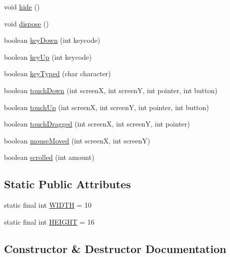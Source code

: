 \begin{DoxyCompactItemize}
void \hyperlink{classbattle_1_1gui_1_1_place_screen_a9a15290163612a59ceb587f623d3981e}{hide} ()
\item 
void \hyperlink{classbattle_1_1gui_1_1_place_screen_a92c96397bd5e073215261dbb39667745}{dispose} ()
\item 
boolean \hyperlink{classbattle_1_1gui_1_1_place_screen_afd827f84464f043634c9486106ab887e}{key\+Down} (int keycode)
\item 
boolean \hyperlink{classbattle_1_1gui_1_1_place_screen_a1f73c5aa408e52db7299eebc3c850b20}{key\+Up} (int keycode)
\item 
boolean \hyperlink{classbattle_1_1gui_1_1_place_screen_a000faa69a9c9dc4bc933539bed194558}{key\+Typed} (char character)
\item 
boolean \hyperlink{classbattle_1_1gui_1_1_place_screen_add2fe6657785a574fbc91787085eb70c}{touch\+Down} (int screen\+X, int screen\+Y, int pointer, int button)
\item 
boolean \hyperlink{classbattle_1_1gui_1_1_place_screen_a91bb3725374aa647ebb36641b5290aeb}{touch\+Up} (int screen\+X, int screen\+Y, int pointer, int button)
\item 
boolean \hyperlink{classbattle_1_1gui_1_1_place_screen_abc5c506818f56f4d300bc5a1f2a94841}{touch\+Dragged} (int screen\+X, int screen\+Y, int pointer)
\item 
boolean \hyperlink{classbattle_1_1gui_1_1_place_screen_acb4a225adaed62d968fcc788a74fc337}{mouse\+Moved} (int screen\+X, int screen\+Y)
\item 
boolean \hyperlink{classbattle_1_1gui_1_1_place_screen_ae261574dcfa984d4d26f531cccc36c04}{scrolled} (int amount)
\end{DoxyCompactItemize}
\subsection*{Static Public Attributes}
\begin{DoxyCompactItemize}
\item 
static final int \hyperlink{classbattle_1_1gui_1_1_place_screen_aed4d70ef868550ef0f7d02e26874b8e1}{W\+I\+D\+T\+H} = 10
\item 
static final int \hyperlink{classbattle_1_1gui_1_1_place_screen_ade40d1f1c52244a32d6e8718dc662d2d}{H\+E\+I\+G\+H\+T} = 16
\end{DoxyCompactItemize}


\subsection{Constructor \& Destructor Documentation}
\hypertarget{classbattle_1_1gui_1_1_place_screen_af50b7a63f86d3fe98a199733d0475cc0}{}

